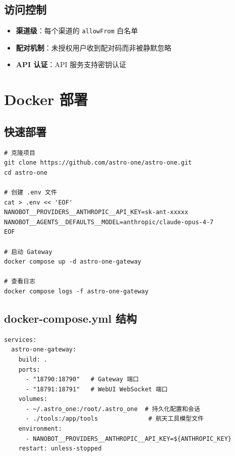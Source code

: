 \documentclass[12pt,a4paper,UTF8]{ctexart}
\begin{document}
\section{访问控制}

\begin{itemize}
    \item \textbf{渠道级}：每个渠道的 \texttt{allowFrom} 白名单
    \item \textbf{配对机制}：未授权用户收到配对码而非被静默忽略
    \item \textbf{API 认证}：API 服务支持密钥认证
\end{itemize}

\chapter{Docker 部署}

\section{快速部署}

\begin{verbatim}
# 克隆项目
git clone https://github.com/astro-one/astro-one.git
cd astro-one

# 创建 .env 文件
cat > .env << 'EOF'
NANOBOT__PROVIDERS__ANTHROPIC__API_KEY=sk-ant-xxxxx
NANOBOT__AGENTS__DEFAULTS__MODEL=anthropic/claude-opus-4-7
EOF

# 启动 Gateway
docker compose up -d astro-one-gateway

# 查看日志
docker compose logs -f astro-one-gateway
\end{verbatim}

\section{docker-compose.yml 结构}

\begin{verbatim}
services:
  astro-one-gateway:
    build: .
    ports:
      - "18790:18790"   # Gateway 端口
      - "18791:18791"   # WebUI WebSocket 端口
    volumes:
      - ~/.astro_one:/root/.astro_one  # 持久化配置和会话
      - ./tools:/app/tools              # 航天工具模型文件
    environment:
      - NANOBOT__PROVIDERS__ANTHROPIC__API_KEY=${ANTHROPIC_KEY}
    restart: unless-stopped
\end{verbatim}
\end{document}
